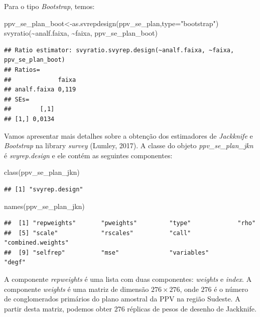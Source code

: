 \documentclass[
  12pt,
  brazilian,
]{book}
\newenvironment{Shaded}{\begin{snugshade}}{\end{snugshade}}
\newcommand{\AttributeTok}[1]{\textcolor[rgb]{0.77,0.63,0.00}{#1}}
\newcommand{\FunctionTok}[1]{\textcolor[rgb]{0.00,0.00,0.00}{#1}}
\newcommand{\NormalTok}[1]{#1}
\newcommand{\OtherTok}[1]{\textcolor[rgb]{0.56,0.35,0.01}{#1}}
\newcommand{\SpecialCharTok}[1]{\textcolor[rgb]{0.00,0.00,0.00}{#1}}
\newcommand{\StringTok}[1]{\textcolor[rgb]{0.31,0.60,0.02}{#1}}
\theoremstyle{definition}
\theoremstyle{definition}
\theoremstyle{definition}
\theoremstyle{definition}
\theoremstyle{remark}
\begin{document}
Para o tipo \emph{Bootstrap}, temos:

\begin{Shaded}
\begin{Highlighting}[]
\NormalTok{ppv\_se\_plan\_boot}\OtherTok{\textless{}{-}}\FunctionTok{as.svrepdesign}\NormalTok{(ppv\_se\_plan,}\AttributeTok{type=}\StringTok{"bootstrap"}\NormalTok{)}
\FunctionTok{svyratio}\NormalTok{(}\SpecialCharTok{\textasciitilde{}}\NormalTok{analf.faixa, }\SpecialCharTok{\textasciitilde{}}\NormalTok{faixa, ppv\_se\_plan\_boot)}
\end{Highlighting}
\end{Shaded}

\begin{verbatim}
## Ratio estimator: svyratio.svyrep.design(~analf.faixa, ~faixa, ppv_se_plan_boot)
## Ratios=
##             faixa
## analf.faixa 0,119
## SEs=
##        [,1]
## [1,] 0,0134
\end{verbatim}

Vamos apresentar mais detalhes sobre a obtenção dos estimadores de \emph{Jackknife} e \emph{Bootstrap} na library \emph{survey} (Lumley, 2017).
A classe do objeto \emph{ppv\_se\_plan\_jkn} é \emph{svyrep.design} e ele contém as seguintes componentes:

\begin{Shaded}
\begin{Highlighting}[]
\FunctionTok{class}\NormalTok{(ppv\_se\_plan\_jkn)}
\end{Highlighting}
\end{Shaded}

\begin{verbatim}
## [1] "svyrep.design"
\end{verbatim}

\begin{Shaded}
\begin{Highlighting}[]
\FunctionTok{names}\NormalTok{(ppv\_se\_plan\_jkn)}
\end{Highlighting}
\end{Shaded}

\begin{verbatim}
##  [1] "repweights"       "pweights"         "type"             "rho"             
##  [5] "scale"            "rscales"          "call"             "combined.weights"
##  [9] "selfrep"          "mse"              "variables"        "degf"
\end{verbatim}

A componente \emph{repweights} é uma lista com duas componentes: \emph{weights} e \emph{index}. A componente
\emph{weights} é uma matriz de dimensão \(276 \times 276\), onde \(276\) é o número de conglomerados primários do plano
amostral da PPV na região Sudeste. A partir desta matriz, podemos obter \(276\) réplicas de pesos de desenho de Jackknife.
\end{document}
